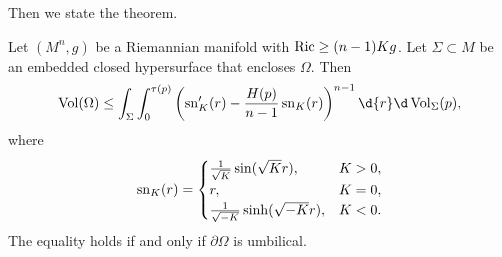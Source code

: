 Then we state the theorem.
\begin{thm}
    Let $(M^n,g)$ be a Riemannian manifold with $\operatorname{Ric}\geq(n-1)Kg$.
    Let $\Sigma\subset M$ be an embedded closed hypersurface that encloses $\Omega$.
    Then
    \[\Vol(\Omega)\leq\int_\Sigma\int_0^{\tau(p)}\left(\sn'_K(r)-\frac{H(p)}{n-1}\sn_K(r)\right)^{n-1}\d{r}\d\Vol_{\Sigma}(p),\]
    where
    \[\operatorname{sn}_K(r)=\begin{cases}
        \frac{1}{\sqrt{K}}\sin(\sqrt{K}r), & K>0,\\
        r, & K=0,\\
        \frac{1}{\sqrt{-K}}\sinh(\sqrt{-K}r), & K<0.
    \end{cases}\]
    The equality holds if and only if $\partial\Omega$ is umbilical.
\end{thm}
